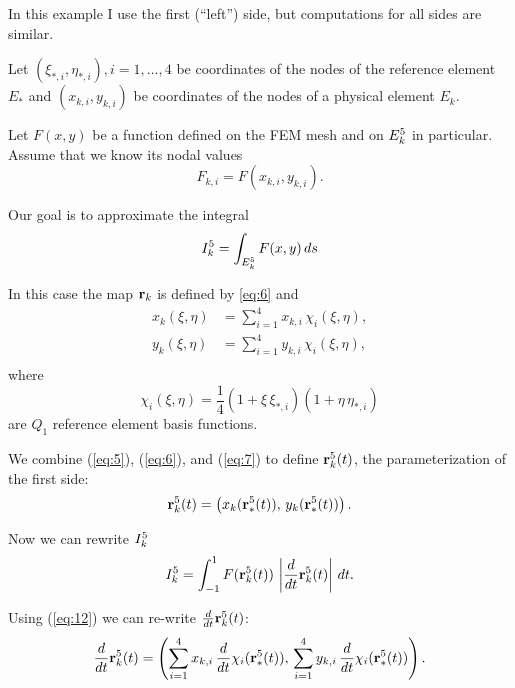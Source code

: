 \documentclass[11pt]{article}
\begin{document}
In this example I use the first (``left'') side, but computations for
all sides are similar.

Let $(\xi_{*,i}, \eta_{*,i}), i = 1,\dots,4$ be coordinates of the nodes
of the reference element $E_{*}$ and $(x_{k,i}, y_{k,i})$ be coordinates
of the nodes of a physical element $E_{k}$.

Let $F(x,y)$ be a function defined on the FEM mesh and on $E_{k}^{5}$ in
particular. Assume that we know its nodal values
\begin{equation}
\label{eq:10}
F_{k,i} = F(x_{k,i}, y_{k,i}).
\end{equation}

Our goal is to approximate the integral
\begin{equation}
\label{eq:11}
I_{k}^{5} = \int_{E_{k}^{5}} F(x,y)\, ds
\end{equation}

In this case the map $\mathbf{r}_{k}$ is defined by \eqref{eq:6} and
\begin{equation}
\label{eq:12}
\begin{aligned}
x_{k}(\xi,\eta) &= \sum_{i=1}^{4} x_{k,i}\, \chi_{i}(\xi, \eta),\\
y_{k}(\xi,\eta) &= \sum_{i=1}^{4} y_{k,i}\, \chi_{i}(\xi, \eta),\\
\end{aligned}
\end{equation}
where
\begin{equation}
\label{eq:13}
\chi_{i}(\xi,\eta) = \frac14 (1 + \xi\,\xi_{*,i})(1 + \eta\,\eta_{*,i})
\end{equation}
are $Q_{1}$ reference element basis functions.

We combine (\ref{eq:5}), (\ref{eq:6}), and (\ref{eq:7}) to define $\mathbf{r}_{k}^{5}(t)$, the parameterization of the first side:
\begin{equation}
  \label{eq:36}
  \mathbf{r}_{k}^{5}(t) = \left( x_{k}(\mathbf{r}_{*}^{5}(t)),\, y_{k}(\mathbf{r}_{*}^{5}(t)) \right).
\end{equation}

Now we can rewrite $I_{k}^{5}$
\begin{equation}
\label{eq:14}
I_{k}^{5} = \int_{-1}^{1} F(\mathbf{r}_{k}^{5}(t))\, \left|\frac{d}{dt}\mathbf{r}_{k}^{5}(t) \right|\, dt.
\end{equation}

Using (\ref{eq:12}) we can re-write $\frac{d}{dt} \mathbf{r}_{k}^{5}(t)$:
\begin{equation}
\label{eq:15}
\frac{d}{dt} \mathbf{r}_{k}^{5}(t) = \left( \sum_{i=1}^{4} x_{k,i}\, \frac{d}{dt}\chi_{i}(\mathbf{r}_{*}^{5}(t)),\,
                                 \sum_{i=1}^{4} y_{k,i}\, \frac{d}{dt}\chi_{i}(\mathbf{r}_{*}^{5}(t))  \right).
\end{equation}
\end{document}
